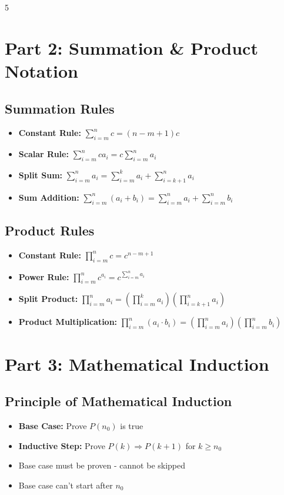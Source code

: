 \documentclass[a4paper,landscape]{article}
\begin{document}
\begin{multicols*}{5}
\section*{Part 2: Summation \& Product Notation}

\subsection*{Summation Rules}
\begin{itemize}[leftmargin=*, itemsep=0pt]
    \item \textbf{Constant Rule:} $\sum_{i=m}^n c = (n-m+1)c$
    \item \textbf{Scalar Rule:} $\sum_{i=m}^n ca_i = c\sum_{i=m}^n a_i$
    \item \textbf{Split Sum:} $\sum_{i=m}^n a_i = \sum_{i=m}^k a_i + \sum_{i=k+1}^n a_i$
    \item \textbf{Sum Addition:} $\sum_{i=m}^n (a_i + b_i) = \sum_{i=m}^n a_i + \sum_{i=m}^n b_i$
\end{itemize}

\subsection*{Product Rules}
\begin{itemize}[leftmargin=*, itemsep=0pt]
    \item \textbf{Constant Rule:} $\prod_{i=m}^n c = c^{n-m+1}$
    \item \textbf{Power Rule:} $\prod_{i=m}^n c^{a_i} = c^{\sum_{i=m}^n a_i}$
    \item \textbf{Split Product:} $\prod_{i=m}^n a_i = (\prod_{i=m}^k a_i)(\prod_{i=k+1}^n a_i)$
    \item \textbf{Product Multiplication:} $\prod_{i=m}^n (a_i \cdot b_i) = (\prod_{i=m}^n a_i)(\prod_{i=m}^n b_i)$
\end{itemize}

\section*{Part 3: Mathematical Induction}

\subsection*{Principle of Mathematical Induction}
\begin{itemize}[leftmargin=*, itemsep=0pt]
    \item \textbf{Base Case:} Prove $P(n_0)$ is true
    \item \textbf{Inductive Step:} Prove $P(k) \Rightarrow P(k+1)$ for $k \geq n_0$
    \item Base case must be proven - cannot be skipped
    \item Base case can't start after $n_0$
\end{itemize}


\end{multicols*}
\end{document}

